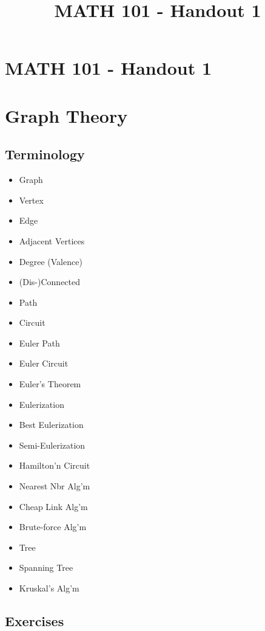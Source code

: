\documentclass[a4paper]{article}
\title{MATH 101 - Handout 1}
\begin{document}
\section*{MATH 101 - Handout 1}

\section{Graph Theory}

\subsection{Terminology}

\begin{multicols}{3}
\begin{itemize}

\item Graph
\item Vertex
\item Edge
\item Adjacent Vertices
\item Degree (Valence)
\item (Dis-)Connected
\item Path
\item Circuit
\item Euler Path
\item Euler Circuit
\item Euler's Theorem
\item Eulerization
\item Best Eulerization
\item Semi-Eulerization
\item Hamilton'n Circuit
\item Nearest Nbr Alg'm
\item Cheap Link Alg'm
\item Brute-force Alg'm
\item Tree
\item Spanning Tree
\item Kruskal's Alg'm

\end{itemize}
\end{multicols}

\subsection{Exercises}

%
%
\begin{figure}[h]
\end{figure}
\end{document}
